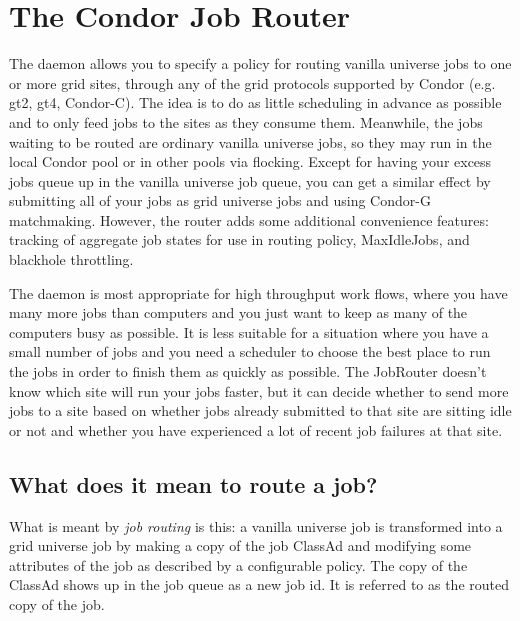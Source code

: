 \section{\label{sec:JobRouter}The Condor Job Router}

The  daemon allows you to specify a policy for routing vanilla universe
jobs to one or more grid sites, through any of the grid protocols
supported by Condor (e.g. gt2, gt4, Condor-C). The idea is to do as
little scheduling in advance as possible and to only feed jobs to the
sites as they consume them. Meanwhile, the jobs waiting to be routed
are ordinary vanilla universe jobs, so they may run in the local
Condor pool or in other pools via flocking. Except for having your
excess jobs queue up in the vanilla universe job queue, you can get a
similar effect by submitting all of your jobs as grid universe jobs
and using Condor-G matchmaking.  However, the router adds some
additional convenience features: tracking of aggregate job states for
use in routing policy, MaxIdleJobs, and blackhole throttling.

The  daemon is most appropriate for high throughput work flows, where you
have many more jobs than computers and you just want to keep as many
of the computers busy as possible.  It is less suitable for a
situation where you have a small number of jobs and you need a
scheduler to choose the best place to run the jobs in order to finish
them as quickly as possible.  The JobRouter doesn't know which site
will run your jobs faster, but it can decide whether to send more jobs
to a site based on whether jobs already submitted to that site are
sitting idle or not and whether you have experienced a lot of recent
job failures at that site.

\subsection{What does it mean to route a job?}

What is meant by \textit{job routing} is this: a vanilla universe job is
transformed into a grid universe job by making a copy of the job
ClassAd and modifying some attributes of the job as described by a
configurable policy.  The copy of the ClassAd shows up in the job
queue as a new job id.  It is referred to as the routed copy of the
job.


